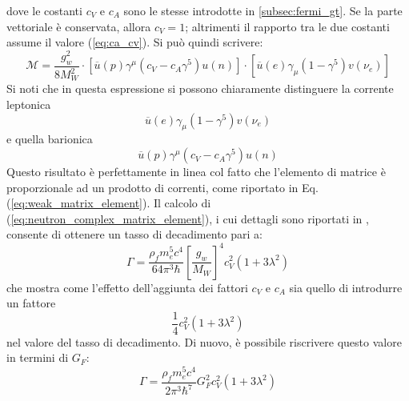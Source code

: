 \documentclass{subnucbo}
\begin{document}
dove le costanti $c_{V}$ e $c_{A}$ sono le stesse introdotte in \ref{subsec:fermi_gt}. Se la parte vettoriale è conservata, allora $c_{V} = 1$; altrimenti il rapporto tra le due costanti assume il valore (\ref{eq:ca_cv}). Si può quindi scrivere:
\begin{equation}
        \mathcal { M } = \frac { g _ { w } ^ { 2 } } { 8 M _ { W } ^ { 2 } } \cdot \left[ \overline { u } ( p ) \gamma ^ { \mu } \left( c _ { V } - c _ { A } \gamma ^ { 5 } \right) u ( n ) \right] \cdot \left[ \overline { u } ( e ) \gamma _ { \mu } \left( 1 - \gamma ^ { 5 } \right) v \left( \nu _ { e } \right) \right]
        \label{eq:neutron_complex_matrix_element}
\end{equation}
Si noti che in questa espressione si possono chiaramente distinguere la corrente leptonica
\begin{equation}
        \overline { u } ( e ) \gamma _ { \mu } \left( 1 - \gamma ^ { 5 } \right) v \left( \nu _ { e } \right)
        \label{eq:leptonic_current}
\end{equation}
e quella barionica
\begin{equation}
        \overline { u } ( p ) \gamma ^ { \mu } \left( c _ { V } - c _ { A } \gamma ^ { 5 } \right) u ( n )
        \label{eq:barionic_current}
\end{equation}
Questo risultato è perfettamente in linea col fatto che l'elemento di matrice è proporzionale ad un prodotto di correnti, come riportato in Eq. (\ref{eq:weak_matrix_element}).
Il calcolo di (\ref{eq:neutron_complex_matrix_element}), i cui dettagli sono riportati in \cite{ref:hayes}, consente di ottenere un tasso di decadimento pari a:
\begin{equation}
        \Gamma = \frac { \rho_{f} m _ { e } ^ { 5 } c ^ { 4 } } { 64 \pi ^ { 3 } \hbar } \left[ \frac { g _ { w } } { M _ { W } } \right] ^ { 4 } c _ { V } ^ { 2 } \left( 1 + 3 \lambda ^ { 2 } \right)
\end{equation}
che mostra come l'effetto dell'aggiunta dei fattori $c_{V}$ e $c_{A}$ sia quello di introdurre un fattore
\begin{equation}
        \frac { 1 } { 4 } c _ { V } ^ { 2 } \left( 1 + 3 \lambda ^ { 2 } \right)
\end{equation}
nel valore del tasso di decadimento. Di nuovo, è possibile riscrivere questo valore in termini di $G_{F}$:
\begin{equation}
        \Gamma = \frac { \rho_{f} m _ { e } ^ { 5 } c^{4} } { 2 \pi ^ { 3 } \hbar ^ { 7 } } G _ { F } ^ { 2 } c_{V}^{2} \left( 1 + 3 \lambda ^ { 2 } \right)
\end{equation}
\end{document}
